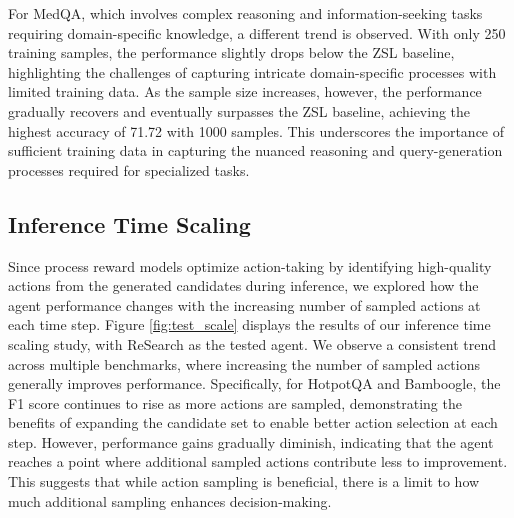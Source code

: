 For MedQA, which involves complex reasoning and information-seeking tasks requiring domain-specific knowledge, a different trend is observed. With only 250 training samples, the performance slightly drops below the ZSL baseline, highlighting the challenges of capturing intricate domain-specific processes with limited training data. As the sample size increases, however, the performance gradually recovers and eventually surpasses the ZSL baseline, achieving the highest accuracy of 71.72 with 1000 samples. This underscores the importance of sufficient training data in capturing the nuanced reasoning and query-generation processes required for specialized tasks.

\subsection{Inference Time Scaling}

Since process reward models optimize action-taking by identifying high-quality actions from the generated candidates during inference, we explored how the agent performance changes with the increasing number of sampled actions at each time step. Figure \ref{fig:test_scale} displays the results of our inference time scaling study, with ReSearch as the tested agent.
We observe a consistent trend across multiple benchmarks, where increasing the number of sampled actions generally improves performance. Specifically, for HotpotQA and Bamboogle, the F1 score continues to rise as more actions are sampled, demonstrating the benefits of expanding the candidate set to enable better action selection at each step. However, performance gains gradually diminish, indicating that the agent reaches a point where additional sampled actions contribute less to improvement. This suggests that while action sampling is beneficial, there is a limit to how much additional sampling enhances decision-making.
